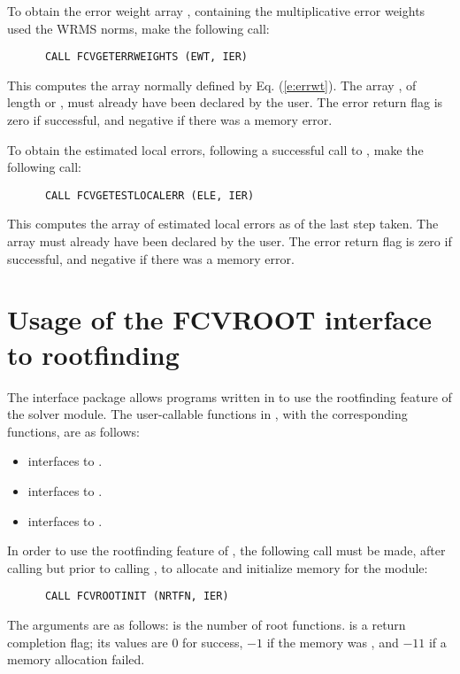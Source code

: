 To obtain the error weight array , containing the multiplicative
error weights used the WRMS norms, make the following call:
\begin{verbatim}
      CALL FCVGETERRWEIGHTS (EWT, IER)
\end{verbatim}
This computes the  array normally defined by Eq. (\ref{e:errwt}).
The array , of length  or , must already have been
declared by the user.  The error return flag  is zero if successful,
and negative if there was a memory error.

To obtain the estimated local errors, following a successful call to
, make the following call:
\begin{verbatim}
      CALL FCVGETESTLOCALERR (ELE, IER)
\end{verbatim}
This computes the  array of estimated local errors as of the last
step taken.  The array  must already have been declared by the user.
The error return flag  is zero if successful, and negative if there
was a memory error.


\section{Usage of the FCVROOT interface to rootfinding}

The {\fcvroot} interface package allows programs written in {\F} to
use the rootfinding feature of the {\cvode} solver module.
The user-callable functions in {\fcvroot}, with the corresponding
{\cvode} functions, are as follows: 
\begin{itemize}
  \item {} interfaces to .
  \item {} interfaces to .
  \item {} interfaces to .
\end{itemize}
In order to use the rootfinding feature of {\cvode}, the following
call must be made, after calling  but prior to calling
, to allocate and initialize memory for the  module:
\begin{verbatim}
      CALL FCVROOTINIT (NRTFN, IER)
\end{verbatim}
The arguments are as follows:
 is the number of root functions.
 is a return completion flag; its values are $0$ for success, $-1$ 
if the  memory was , and $-11$ if a memory allocation failed.

